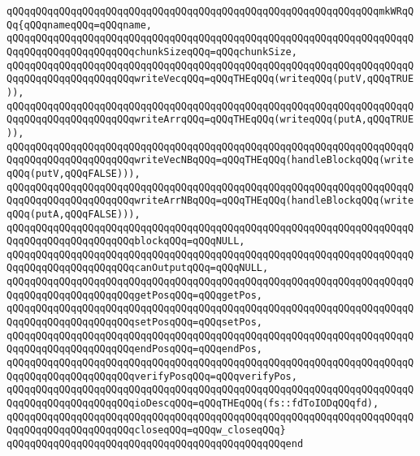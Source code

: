 \verb|qQQqqQQqqQQqqQQqqQQqqQQqqQQqqQQqqQQqqQQqqQQqqQQqqQQqqQQqqQQqqQQqmkWRqQQq{qQQqnameqQQq=qQQqname,|\newline
\verb|qQQqqQQqqQQqqQQqqQQqqQQqqQQqqQQqqQQqqQQqqQQqqQQqqQQqqQQqqQQqqQQqqQQqqQQqqQQqqQQqqQQqqQQqqQQqchunkSizeqQQq=qQQqchunkSize,|\newline
\verb|qQQqqQQqqQQqqQQqqQQqqQQqqQQqqQQqqQQqqQQqqQQqqQQqqQQqqQQqqQQqqQQqqQQqqQQqqQQqqQQqqQQqqQQqqQQqwriteVecqQQq=qQQqTHEqQQq(writeqQQq(putV,qQQqTRUE)),|\newline
\verb|qQQqqQQqqQQqqQQqqQQqqQQqqQQqqQQqqQQqqQQqqQQqqQQqqQQqqQQqqQQqqQQqqQQqqQQqqQQqqQQqqQQqqQQqqQQqwriteArrqQQq=qQQqTHEqQQq(writeqQQq(putA,qQQqTRUE)),|\newline
\verb|qQQqqQQqqQQqqQQqqQQqqQQqqQQqqQQqqQQqqQQqqQQqqQQqqQQqqQQqqQQqqQQqqQQqqQQqqQQqqQQqqQQqqQQqqQQqwriteVecNBqQQq=qQQqTHEqQQq(handleBlockqQQq(writeqQQq(putV,qQQqFALSE))),|\newline
\verb|qQQqqQQqqQQqqQQqqQQqqQQqqQQqqQQqqQQqqQQqqQQqqQQqqQQqqQQqqQQqqQQqqQQqqQQqqQQqqQQqqQQqqQQqqQQqwriteArrNBqQQq=qQQqTHEqQQq(handleBlockqQQq(writeqQQq(putA,qQQqFALSE))),|\newline
\verb|qQQqqQQqqQQqqQQqqQQqqQQqqQQqqQQqqQQqqQQqqQQqqQQqqQQqqQQqqQQqqQQqqQQqqQQqqQQqqQQqqQQqqQQqqQQqblockqQQq=qQQqNULL,|\newline
\verb|qQQqqQQqqQQqqQQqqQQqqQQqqQQqqQQqqQQqqQQqqQQqqQQqqQQqqQQqqQQqqQQqqQQqqQQqqQQqqQQqqQQqqQQqqQQqcanOutputqQQq=qQQqNULL,|\newline
\verb|qQQqqQQqqQQqqQQqqQQqqQQqqQQqqQQqqQQqqQQqqQQqqQQqqQQqqQQqqQQqqQQqqQQqqQQqqQQqqQQqqQQqqQQqqQQqgetPosqQQq=qQQqgetPos,|\newline
\verb|qQQqqQQqqQQqqQQqqQQqqQQqqQQqqQQqqQQqqQQqqQQqqQQqqQQqqQQqqQQqqQQqqQQqqQQqqQQqqQQqqQQqqQQqqQQqsetPosqQQq=qQQqsetPos,|\newline
\verb|qQQqqQQqqQQqqQQqqQQqqQQqqQQqqQQqqQQqqQQqqQQqqQQqqQQqqQQqqQQqqQQqqQQqqQQqqQQqqQQqqQQqqQQqqQQqendPosqQQq=qQQqendPos,|\newline
\verb|qQQqqQQqqQQqqQQqqQQqqQQqqQQqqQQqqQQqqQQqqQQqqQQqqQQqqQQqqQQqqQQqqQQqqQQqqQQqqQQqqQQqqQQqqQQqverifyPosqQQq=qQQqverifyPos,|\newline
\verb|qQQqqQQqqQQqqQQqqQQqqQQqqQQqqQQqqQQqqQQqqQQqqQQqqQQqqQQqqQQqqQQqqQQqqQQqqQQqqQQqqQQqqQQqqQQqioDescqQQq=qQQqTHEqQQq(fs::fdToIODqQQqfd),|\newline
\verb|qQQqqQQqqQQqqQQqqQQqqQQqqQQqqQQqqQQqqQQqqQQqqQQqqQQqqQQqqQQqqQQqqQQqqQQqqQQqqQQqqQQqqQQqqQQqcloseqQQq=qQQqw_closeqQQq}|\newline
\verb|qQQqqQQqqQQqqQQqqQQqqQQqqQQqqQQqqQQqqQQqqQQqqQQqend|\newline
